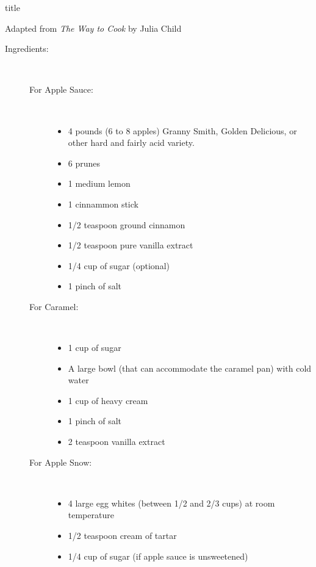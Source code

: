 \documentclass [11pt, letterpaper] {article}
\begin{document}
 {title}

\begin{flushright}
{Adapted from {\it The Way to Cook} by Julia Child}
\end{flushright}


\vspace{0.3in}
\begin{description}

\item[Ingredients:]\ \\
	\begin{description}
	\item[For Apple Sauce:]\ \\
		\begin{itemize}
		\item 4 pounds (6 to 8 apples) Granny Smith, Golden Delicious, or other hard and fairly acid variety.
		\item 6 prunes
		\item 1 medium lemon
		\item 1 cinnammon stick
		\item 1/2 teaspoon ground cinnamon
		\item 1/2 teaspoon pure vanilla extract
		\item 1/4 cup of sugar (optional)
		\item 1 pinch of salt
		\end{itemize}
	\item[For Caramel:]\ \\
		\begin{itemize}
		\item 1 cup of sugar
		\item A large bowl (that can accommodate the caramel pan)  with cold water
		\item 1 cup of heavy cream
		\item 1 pinch of salt
		\item	2 teaspoon vanilla extract
		\end{itemize}
	\item[For Apple Snow:]\ \\
		\begin{itemize}
		\item 4 large egg whites (between 1/2 and 2/3 cups) at room temperature
		\item 1/2 teaspoon cream of tartar
		\item 1/4 cup of sugar (if apple sauce is unsweetened)
		\end{itemize}
	\end{description}


\end{description}
\end{document}

